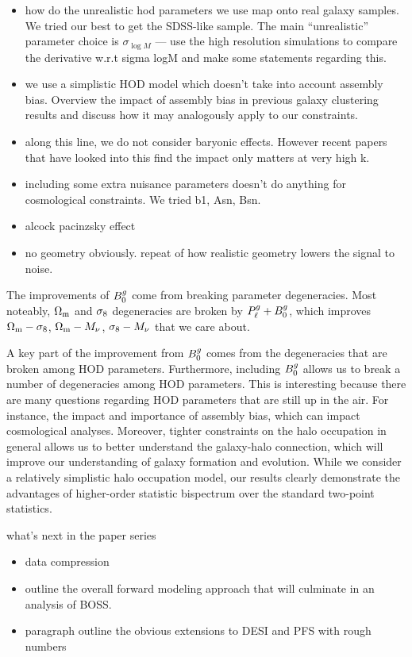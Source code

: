 

\begin{itemize}
    \item how do the unrealistic hod parameters we use map onto real galaxy
        samples. We tried our best to get the SDSS-like sample. The main
        ``unrealistic'' parameter choice is $\sigma_{\log M}$ --- use the
        high resolution simulations to compare the derivative w.r.t sigma logM
        and make some statements regarding this. 
    \item we use a simplistic HOD model which doesn't take into account
        assembly bias. Overview the impact of assembly bias in previous galaxy
        clustering results and discuss how it may analogously apply to our
        constraints.
    \item along this line, we do not consider baryonic effects. However recent
        papers that have looked into this find the impact only matters at very
        high k.  
    \item including some extra nuisance parameters doesn't do anything for
        cosmological constraints. We tried b1, Asn, Bsn.  
    \item alcock pacinzsky effect
    \item no geometry obviously. repeat of how realistic geometry lowers the
        signal to noise. 
\end{itemize}

The improvements of $B^g_0$ come from breaking parameter degeneracies. 
Most noteably, $\Omega_{\rm m}$ and $\sigma_8$ degeneracies are broken by
$P^g_{\ell} + B^g_0$, which improves $\Omega_{\rm m} - \sigma_8$, $\Omega_{\rm m} - M_\nu$, $\sigma_8-M_\nu$ that we care about. 

A key part of the improvement from $B^g_0$ comes from the degeneracies that are
broken among HOD parameters. 
Furthermore, including $B^g_0$ allows us to break a number of degeneracies among
HOD parameters. This is interesting because there are many questions regarding
HOD parameters that are still up in the air. For instance, the impact and
importance of assembly bias, which can impact cosmological analyses. Moreover,
tighter constraints on the halo occupation in general allows us to better 
understand the galaxy-halo connection, which will improve our understanding of
galaxy formation and evolution. While we consider a relatively simplistic halo
occupation model, our results clearly demonstrate the advantages of
higher-order statistic bispectrum over the standard two-point statistics. 

what's next in the paper series 
\begin{itemize}
    \item data compression 
    \item outline the overall forward modeling approach that will culminate in
        an analysis of BOSS. 
    \item paragraph outline the obvious extensions to DESI and PFS with rough
        numbers 
\end{itemize}
